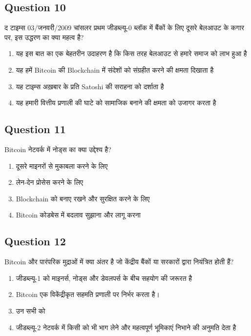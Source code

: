 \documentclass[12pt,a4paper]{article}
\begin{document}
\bigskip


\subsection*{Question 10}
द टाइम्स 03/जनवरी/2009 चांसलर प्रथम जीडब्ल्यू-0 ब्लॉक में बैंकों के लिए दूसरे बेलआउट के कगार पर, इस उद्धरण का क्या महत्व है?

\begin{enumerate}[label=\Alph*., leftmargin=*]
\item यह इस बात का एक बेहतरीन उदाहरण है कि किस तरह बेलआउट से हमारे समाज को लाभ हुआ है
\item यह हमें Bitcoin की Blockchain में संदेशों को संग्रहीत करने की क्षमता दिखाता है
\item यह टाइम्स अख़बार के प्रति Satoshi की सराहना को दर्शाता है
\item यह हमारी वित्तीय प्रणाली की घाटे को सामाजिक बनाने की क्षमता को उजागर करता है
\end{enumerate}

\bigskip


\subsection*{Question 11}
Bitcoin नेटवर्क में नोड्स का क्या उद्देश्य है?

\begin{enumerate}[label=\Alph*., leftmargin=*]
\item दूसरे माइनरों से मुकाबला करने के लिए
\item लेन-देन प्रोसेस करने के लिए
\item Blockchain को बनाए रखने और सुरक्षित करने के लिए
\item Bitcoin कोडबेस में बदलाव सुझाना और लागू करना
\end{enumerate}

\bigskip


\subsection*{Question 12}
Bitcoin और पारंपरिक मुद्राओं में क्या अंतर है जो केंद्रीय बैंकों या सरकारों द्वारा नियंत्रित होती हैं?

\begin{enumerate}[label=\Alph*., leftmargin=*]
\item जीडब्ल्यू-1 को माइनर्स, नोड्स और डेवलपर्स के बीच सहयोग की जरूरत है
\item Bitcoin एक विकेंद्रीकृत सहमति प्रणाली पर निर्भर करता है।
\item उन सभी को
\item जीडब्ल्यू-2 नेटवर्क में किसी को भी भाग लेने और महत्वपूर्ण भूमिकाएं निभाने की अनुमति देता है
\end{enumerate}
\end{document}
